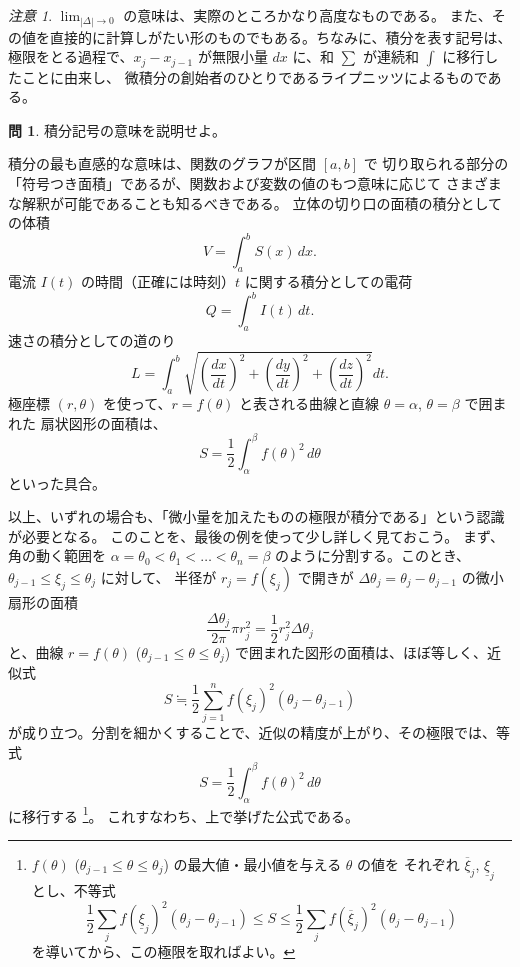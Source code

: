 \documentclass[a4paper]{jsarticle}
\theoremstyle{definition}
\newtheorem{Exercise}{問}%
\theoremstyle{remark}
\newtheorem{Remark}{注意}
\begin{document}
\begin{Remark}
{\small
$\displaystyle \lim_{|\Delta| \to 0}$ の意味は、実際のところかなり高度なものである。
また、その値を直接的に計算しがたい形のものでもある。ちなみに、積分を表す記号は、
極限をとる過程で、$x_j - x_{j-1}$ が無限小量 $dx$ に、和 $\sum$ が連続和 $\int$ に移行したことに由来し、
微積分の創始者のひとりであるライプニッツによるものである。}
\end{Remark}

\begin{Exercise}
  積分記号の意味を説明せよ。
\end{Exercise}

積分の最も直感的な意味は、関数のグラフが区間 $[a,b]$ で
切り取られる部分の
「符号つき面積」であるが、関数および変数の値のもつ意味に応じて
さまざまな解釈が可能であることも知るべきである。
立体の切り口の面積の積分としての体積
\[
V = \int_a^b S(x)\,dx.
\]
電流 $I(t)$ の時間（正確には時刻）$t$ に関する積分としての電荷
\[
Q = \int_a^b I(t)\,dt. 
\]
速さの積分としての道のり
\[
L = \int_a^b \sqrt{ \left(\frac{dx}{dt}\right)^2
+ \left(\frac{dy}{dt}\right)^2
+ \left(\frac{dz}{dt}\right)^2
} dt. 
\]
極座標 $(r,\theta)$ を使って、$r = f(\theta)$ と表される曲線と直線 $\theta = \alpha$, $\theta = \beta$ で囲まれた
扇状図形の面積は、
\[
S = \frac{1}{2} \int_\alpha^\beta f(\theta)^2\, d\theta 
\]
といった具合。

\begin{figure}[h]
  \centering
  
  \caption{}
\end{figure}

以上、いずれの場合も、「微小量を加えたものの極限が積分である」という認識が必要となる。
このことを、最後の例を使って少し詳しく見ておこう。
まず、角の動く範囲を $\alpha=\theta_0 < \theta_1 < \dots <\theta_n = \beta$ のように分割する。このとき、
$\theta_{j-1} \leq \xi_j \leq \theta_j$ に対して、
半径が $r_j= f(\xi_j)$ で開きが $\Delta \theta_j = \theta_j - \theta_{j-1}$ 
の微小扇形の面積 
\[
\frac{\Delta\theta_j}{2\pi} \pi r_j^2 = \frac{1}{2} r_j^2 \Delta \theta_j 
\]
と、曲線 $r = f(\theta)$ 
($\theta_{j-1} \leq \theta \leq \theta_j$) で囲まれた図形の面積は、ほぼ等しく、近似式
\[
S \fallingdotseq \frac{1}{2} \sum_{j=1}^n f(\xi_j)^2 (\theta_j - \theta_{j-1})
\]
が成り立つ。分割を細かくすることで、近似の精度が上がり、その極限では、等式
\[
S = \frac{1}{2} \int_\alpha^\beta f(\theta)^2\, d\theta 
\]
に移行する
\footnote{
$f(\theta)$ ($\theta_{j-1} \leq \theta \leq \theta_j$) の最大値・最小値を与える $\theta$ の値を
それぞれ $\overline{\xi}_j$, $\underline{\xi}_j$ とし、不等式
\[
\frac{1}{2} \sum_j f({\underline \xi}_j)^2(\theta_j - \theta_{j-1}) 
\leq 
S
\leq
\frac{1}{2} \sum_j f({\overline \xi}_j)^2(\theta_j - \theta_{j-1}) 
\]
を導いてから、この極限を取ればよい。}。
これすなわち、上で挙げた公式である。
\end{document}
